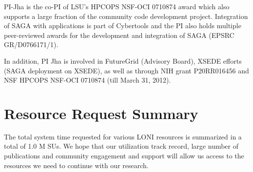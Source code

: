 \documentclass[a4paper,11pt]{article}
\newcommand{\up}{\vspace*{-1em}}
\begin{document}
 
PI-Jha is the co-PI of LSU's HPCOPS NSF-OCI 0710874 award which also supports a large fraction of the community code development project. Integration of SAGA with applications is part of Cybertools and the PI also holds multiple peer-reviewed awards for the development and integration of SAGA (EPSRC GR/D0766171/1). %

In addition, PI Jha is involved in FutureGrid (Advisory Board), XSEDE efforts (SAGA deployment on XSEDE), as well as through NIH grant P20RR016456 and NSF HPCOPS NSF-OCI 0710874 (till March 31, 2012).

\section{Resource Request Summary}



The total system time requested for various LONI resources is summarized in a total of 1.0 M SUs.  We hope that our utilization track record, large number of publications and community engagement and support will allow us access to the resources we need to continue with our research.




\end{document}
